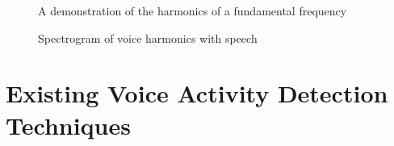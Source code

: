 \documentclass[ %
                    author={Sam Phippen},
                supervisor={Dr. Rafal Bogacz},
                     title={Real time voice activity detectors in noisy personal computing environments},
                  subtitle={},
                    degree={MEng},
                      year={2012} ]{thesis}
\begin{document}
\begin{figure}
    \label{img:harmonics}
    \caption{A demonstration of the harmonics of a fundamental frequency}
\end{figure}

\begin{figure}
    \label{img:spectrogram}
    \caption{Spectrogram of voice harmonics with speech}
\end{figure}

\section{Existing Voice Activity Detection Techniques}
\end{document}
